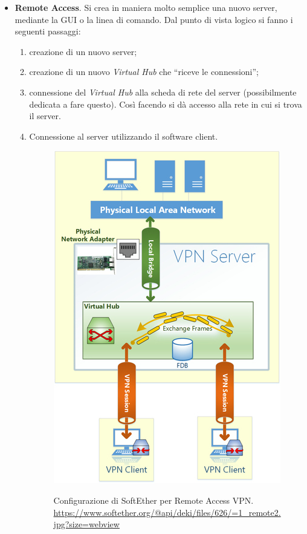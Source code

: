 \begin{itemize}
  \item \textbf{Remote Access}. Si crea in maniera molto semplice una nuovo server, mediante la GUI o
  la linea di comando. Dal punto di vista logico si fanno i seguenti passaggi:
  \begin{enumerate}
    \item creazione di un nuovo server;
    \item creazione di un nuovo \textit{Virtual Hub} che ``riceve le connessioni'';
    \item connessione del \textit{Virtual Hub} alla scheda di rete del server (possibilmente dedicata a fare
    questo). Così facendo si dà accesso alla rete in cui si trova il server.
    \item Connessione al server utilizzando il software client.
    \begin{figure}
      \includegraphics[scale=0.4]{img/softether_ras}
      \label{fig:softether_ras}
      \caption[Configurazione di SoftEther per Remote Access VPN]{
        Configurazione di SoftEther per Remote Access VPN.
        \url{https://www.softether.org/@api/deki/files/626/=1_remote2.jpg?size=webview}}
    \end{figure}

\end{enumerate}
\end{itemize}
